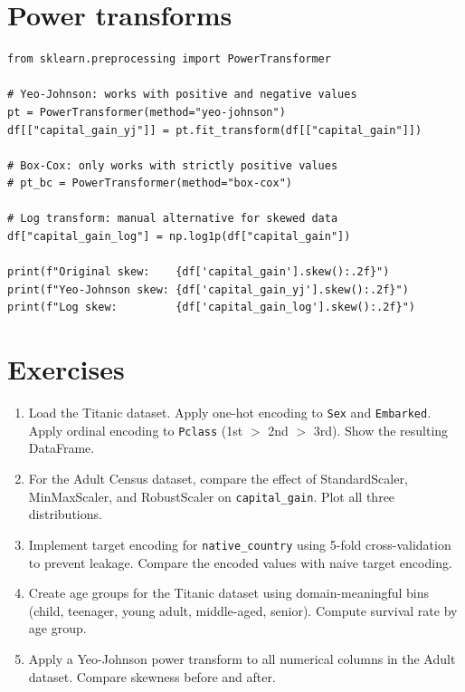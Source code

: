 \section{Power transforms}

\begin{verbatim}
from sklearn.preprocessing import PowerTransformer

# Yeo-Johnson: works with positive and negative values
pt = PowerTransformer(method="yeo-johnson")
df[["capital_gain_yj"]] = pt.fit_transform(df[["capital_gain"]])

# Box-Cox: only works with strictly positive values
# pt_bc = PowerTransformer(method="box-cox")

# Log transform: manual alternative for skewed data
df["capital_gain_log"] = np.log1p(df["capital_gain"])

print(f"Original skew:    {df['capital_gain'].skew():.2f}")
print(f"Yeo-Johnson skew: {df['capital_gain_yj'].skew():.2f}")
print(f"Log skew:         {df['capital_gain_log'].skew():.2f}")
\end{verbatim}

\section{Exercises}

\begin{exercise}
\begin{enumerate}
  \item Load the Titanic dataset. Apply one-hot encoding to \texttt{Sex} and \texttt{Embarked}. Apply ordinal encoding to \texttt{Pclass} (1st $>$ 2nd $>$ 3rd). Show the resulting DataFrame.
  \item For the Adult Census dataset, compare the effect of StandardScaler, MinMaxScaler, and RobustScaler on \texttt{capital\_gain}. Plot all three distributions.
  \item Implement target encoding for \texttt{native\_country} using 5-fold cross-validation to prevent leakage. Compare the encoded values with naive target encoding.
  \item Create age groups for the Titanic dataset using domain-meaningful bins (child, teenager, young adult, middle-aged, senior). Compute survival rate by age group.
  \item Apply a Yeo-Johnson power transform to all numerical columns in the Adult dataset. Compare skewness before and after.
\end{enumerate}
\end{exercise}

